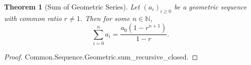 \documentclass{article}
\newtheorem{theorem}{Theorem}
\begin{document}
\begin{theorem}[Sum of Geometric Series]

Let $(a_i)_{i \geq 0}$ be a geometric sequence with common ratio $r \neq 1$.
Then for some $n \in \mathbb{N}$,
$$\sum_{i=0}^n a_i = \frac{a_0(1 - r^{n+1})}{1 - r}.$$

\end{theorem}

\begin{proof}

Common.Sequence.Geometric.sum\_recursive\_closed.

\end{proof}
\end{document}
